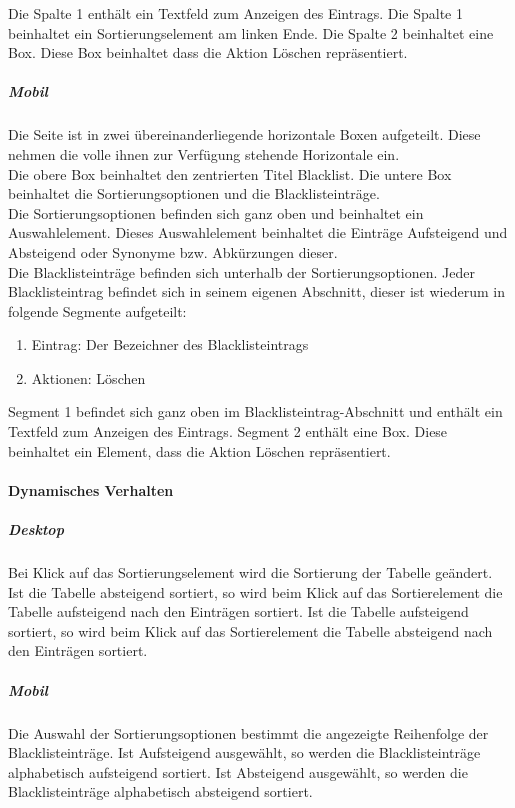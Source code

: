 Die Spalte 1 enthält ein Textfeld zum Anzeigen des Eintrags.
Die Spalte 1 beinhaltet ein Sortierungselement am linken Ende.
Die Spalte 2 beinhaltet eine Box. Diese Box beinhaltet dass die Aktion \dq Löschen \dq{} repräsentiert.

\subparagraph*{Mobil}
Die Seite ist in zwei übereinanderliegende horizontale Boxen aufgeteilt. Diese nehmen die volle ihnen zur Verfügung stehende Horizontale ein.\\
Die obere Box beinhaltet den zentrierten Titel \dq Blacklist\dq.
Die untere Box beinhaltet die Sortierungsoptionen und die Blacklisteinträge.\\
Die Sortierungsoptionen befinden sich ganz oben und beinhaltet ein Auswahlelement. 
Dieses Auswahlelement beinhaltet die Einträge \dq Aufsteigend \dq{} und \dq Absteigend \dq{} oder Synonyme bzw. Abkürzungen dieser.\\
Die Blacklisteinträge befinden sich unterhalb der Sortierungsoptionen.
Jeder Blacklisteintrag befindet sich in seinem eigenen Abschnitt, dieser ist wiederum in folgende Segmente aufgeteilt:

\begin{enumerate}
    \item Eintrag: Der Bezeichner des Blacklisteintrags
    \item Aktionen: Löschen
\end{enumerate}

Segment 1 befindet sich ganz oben im Blacklisteintrag-Abschnitt und enthält ein Textfeld zum Anzeigen des Eintrags.
Segment 2 enthält eine Box. Diese beinhaltet ein Element, dass die Aktion \dq Löschen \dq{} repräsentiert.

\paragraph*{Dynamisches Verhalten}
\subparagraph*{Desktop}
Bei Klick auf das Sortierungselement wird die Sortierung der Tabelle geändert.
Ist die Tabelle absteigend sortiert, so wird beim Klick auf das Sortierelement die Tabelle aufsteigend nach den Einträgen sortiert.
Ist die Tabelle aufsteigend sortiert, so wird beim Klick auf das Sortierelement die Tabelle absteigend nach den Einträgen sortiert.

\subparagraph*{Mobil}
Die Auswahl der Sortierungsoptionen bestimmt die angezeigte Reihenfolge der Blacklisteinträge.
Ist \dq Aufsteigend \dq{} ausgewählt, so werden die Blacklisteinträge alphabetisch aufsteigend sortiert.
Ist \dq Absteigend \dq{} ausgewählt, so werden die Blacklisteinträge alphabetisch absteigend sortiert.

